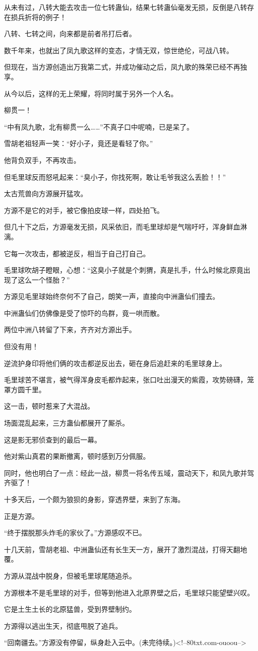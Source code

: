 \begin{this_body}
从未有过，八转大能去攻击一位七转蛊仙，结果七转蛊仙毫发无损，反倒是八转存在损兵折将的例子！

八转、七转之间，向来都是前者吊打后者。

数千年来，也就出了凤九歌这样的变态，才情无双，惊世绝伦，可战八转。

但现在，当方源创造出万我第二式，并成功催动之后，凤九歌的殊荣已经不再独享。

从今以后，这样的无上荣耀，将同时属于另外一个人名。

柳贯一！

“中有凤九歌，北有柳贯一么……”不真子口中呢喃，已是呆了。

雪胡老祖轻声一笑：“好小子，竟还是看轻了你。”

他背负双手，不再攻击。

但毛里球反而怒吼起来：“臭小子，你找死啊，敢让毛爷我这么丢脸！！”

太古荒兽向方源展开猛攻。

方源不是它的对手，被它像拍皮球一样，四处拍飞。

但几十下之后，方源毫发无损，风采依旧，而毛里球却是气喘吁吁，浑身鲜血淋漓。

它每一次攻击，都被逆反，相当于自己打自己。

毛里球吹胡子瞪眼，心想：“这臭小子就是个刺猬，真是扎手，什么时候北原竟出现了这么一个怪胎？”

方源见毛里球始终奈何不了自己，朗笑一声，直接向中洲蛊仙们撞去。

中洲蛊仙们仿佛像是受了惊吓的鸟群，竟一哄而散。

两位中洲八转留了下来，齐齐对方源出手。

但没有用！

逆流护身印将他们俩的攻击都逆反出去，砸在身后追赶来的毛里球身上。

毛里球苦不堪言，被气得浑身皮毛都炸起来，张口吐出漫天的紫霞，攻势磅礴，笼罩方圆千里。

这一击，顿时惹来了大混战。

场面混乱起来，三方蛊仙都展开了厮杀。

这是影无邪侦查到的最后一幕。

他对紫山真君的果断撤离，顿时感到万分佩服。

同时，他也明白了一点：经此一战，柳贯一将名传五域，震动天下，和凤九歌并驾齐驱了！

十多天后，一个颇为狼狈的身影，穿透界壁，来到了东海。

正是方源。

“终于摆脱那头炸毛的家伙了。”方源感叹不已。

十几天前，雪胡老祖、中洲蛊仙还有长生天一方，展开了激烈混战，打得天翻地覆。

方源从混战中脱身，但被毛里球尾随追杀。

方源根本不是毛里球的对手，但等到他进入北原界壁之后，毛里球只能望壁兴叹。

它是土生土长的北原猛兽，受到界壁制约。

方源得以逃出生天，彻底甩脱了追兵。

“回南疆去。”方源没有停留，纵身赴入云中。(未完待续。)<!--80txt.com-ouoou-->

\end{this_body}

